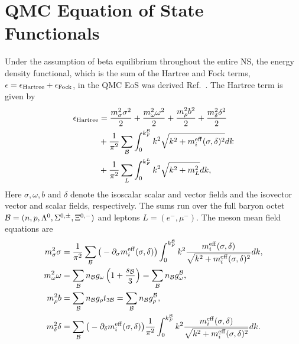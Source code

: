 \chapter{QMC Equation of State Functionals}
\label{app:QMC_details}

Under the assumption of beta equilibrium throughout the entire NS, the energy density functional, which is the sum of the Hartree and Fock terms, $\epsilon = \epsilon_{\rm Hartree} + \epsilon_\mathrm{Fock}$, in the QMC EoS was derived Ref.~\cite{Motta:2019tjc_Isovectoreffectsneutron}. The Hartree term is given by
%
\begin{equation}
	\begin{split}
		\epsilon_{\rm Hartree} & = \frac{m_\sigma^2\sigma^2}{2} + \frac{m_\omega^2\omega^2}{2}+ \frac{m_\rho^2b^2}{2} + \frac{m_\delta^2\delta^2}{2}\\
		&+ \frac{1}{\pi^2}\sum_{\cal B}\int_{0}^{k_F^{\cal B}}{k^2}{\sqrt{k^2+m_i^{\rm eff}(\sigma,\delta)^2}dk}   \\
		& + \frac{1}{\pi^2}\sum_L \int_{0}^{k_F^L}{k^2}{\sqrt{k^2+m_L^2}dk},
	\end{split}
\end{equation}
%
Here $\sigma, \omega, b$ and $\delta$ denote the isoscalar scalar and vector fields and the isovector vector and scalar fields, respectively. The sums run over the full baryon octet ${\cal B}=(n, p, \Lambda^0, \Sigma^{0,\pm},  \Xi^{0,-})$ and leptons 
$L=(e^-, \mu^-)$. 
The meson mean field equations are
%
\begin{align}
\label{eq:mean-field}
	m_\sigma^2\sigma  & = \frac{1}{\pi^2} \sum_{\cal B} \big(-\partial_\sigma 
	m_i^{\rm eff}(\sigma,\delta)\big)
	 \int_0^{k_F^{\cal B}} k^2 
	\frac{m_i^{\rm eff}(\sigma,{\delta})}{\sqrt{k^2 + m_i^{\rm eff}(\sigma,{\delta})^2}}dk,  \\
	m_\omega^2 \omega  & = \sum_{\cal B} n_{\cal B} g_\omega  \left( 1+\frac{s_{\cal B}}{3} \right) =
	\sum_{\cal B}  n_{\cal B} g_\omega^{\cal B} , \\
	m_\rho^2 b & = \sum_{\cal B}  n_{\cal B} g_\rho t_{3\cal B} =\sum_{\cal B}  n_{\cal B} g_\rho^{\cal B} , \label{eq:meanrho} \\
	m_\delta^2{\delta}  & =  \sum_{\cal B} \big(-\partial_\delta m_i^{\rm eff}(\sigma,\delta)\big)
	\frac{1}{\pi^2}\int_0^{k_F^{\cal B}} k^2 
	\frac{m_i^{\rm eff}(\sigma,{\delta})}{\sqrt{k^2 + m_i^{\rm eff}(\sigma,{\delta})^2}}dk.
\end{align}
